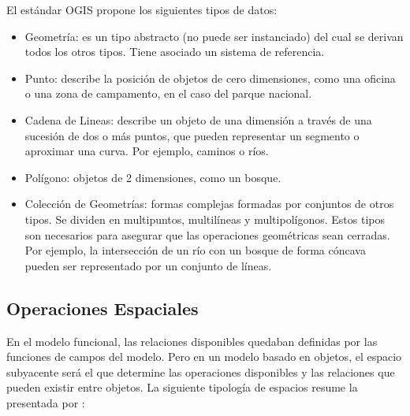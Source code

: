 El estándar OGIS propone los siguientes tipos de datos:
\begin{itemize}
    \item Geometría: es un tipo abstracto (no puede ser instanciado) del cual se derivan todos los otros tipos.
    Tiene asociado un sistema de referencia.
    \item Punto: describe la posición de objetos de cero dimensiones,
    como una oficina o una zona de campamento, en el caso del parque nacional.
    \item Cadena de Lineas: describe un objeto de una dimensión a través de una sucesión de dos o más puntos,
    que pueden representar un segmento o aproximar una curva. Por ejemplo, caminos o ríos.
    \item Polígono: objetos de 2 dimensiones, como un bosque.
    \item Colección de Geometrías: formas complejas formadas por conjuntos de otros tipos.
    Se dividen en multipuntos, multilíneas y multipolígonos.
    Estos tipos son necesarios para asegurar que las operaciones geométricas sean cerradas.
    Por ejemplo, la intersección de un río con un bosque de forma cóncava pueden ser representado por un conjunto de líneas.
\end{itemize}

\subsection{Operaciones Espaciales}

En el modelo funcional, las relaciones disponibles quedaban definidas por las funciones de campos del modelo.
Pero en un modelo basado en objetos, el espacio subyacente será el que determine las operaciones disponibles
y las relaciones que pueden existir entre objetos. La siguiente tipología de espacios resume la presentada por \cite{spatial:book}:

